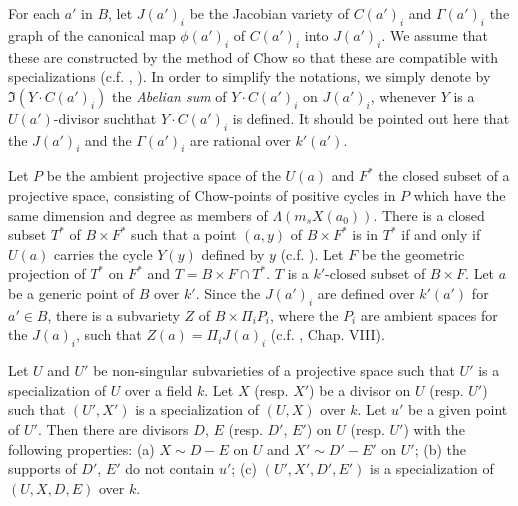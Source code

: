 For each $a'$ in $B$, let $J(a')_{i}$ be the Jacobian variety of $C(a')_{i}$ and $\Gamma(a')_{i}$ the graph of the canonical map $\phi(a')_{i}$ of $C(a')_{i}$ into $J(a')_{i}$. We assume that these are constructed by the method of Chow so that these are compatible with specializations (c.f. \cite{art14-key1}, \cite{art14-key8}). In order to simplify the notations, we simply denote by $\mathfrak{I}(Y\cdot C(a')_{i})$ the {\em Abelian sum} of $Y\cdot C(a')_{i}$ on $J(a')_{i}$, whenever $Y$ is a $U(a')$-divisor such\pageoriginale that $Y\cdot C(a')_{i}$ is defined. It should be pointed out here that the $J(a')_{i}$ and the $\Gamma(a')_{i}$ are rational over $k'(a')$.

Let $P$ be the ambient projective space of the $U(a)$ and $F^{*}$ the closed subset of a projective space, consisting of Chow-points of positive cycles in $P$ which have the same dimension and degree as members of $\Lambda(m_{s}X(a_{0}))$. There is a closed subset $T^{*}$ of $B\times F^{*}$ such that a point $(a,y)$ of $B\times F^{*}$ is in $T^{*}$ if and only if $U(a)$ carries the cycle $Y(y)$ defined by $y$ (c.f. \cite{art14-key3}). Let $F$ be the geometric projection of $T^{*}$ on $F^{*}$ and $T=B\times F\cap T^{*}$. $T$ is a $k'$-closed subset of $B\times F$. Let $a$ be a generic point of $B$ over $k'$. Since the $J(a')_{i}$ are defined over $k'(a')$ for $a'\in B$, there is a subvariety $Z$ of $B\times \Pi_{i}P_{i}$, where the $P_{i}$ are ambient spaces for the $J(a)_{i}$, such that $Z(a)=\Pi_{i}J(a)_{i}$ (c.f. \cite{art14-key25}, Chap. VIII).

\begin{sublemma}\label{art14-app-lem1.3}
Let $U$ and $U'$ be non-singular subvarieties of a projective space such that $U'$ is a specialization of $U$ over a field $k$. Let $X$ (resp. $X'$) be a divisor on $U$ (resp. $U'$) such that $(U',X')$ is a specialization of $(U,X)$ over $k$. Let $u'$ be a given point of $U'$. Then there are divisors $D$, $E$ (resp. $D'$, $E'$) on $U$ (resp. $U'$) with the following properties: {\rm(a)} $X\sim D-E$ on $U$ and $X'\sim D'-E'$ on $U'$; {\rm(b)} the supports of $D'$, $E'$ do not contain $u'$; {\rm(c)} $(U',X',D',E')$ is a specialization of $(U,X,D,E)$ over $k$.
\end{sublemma}

